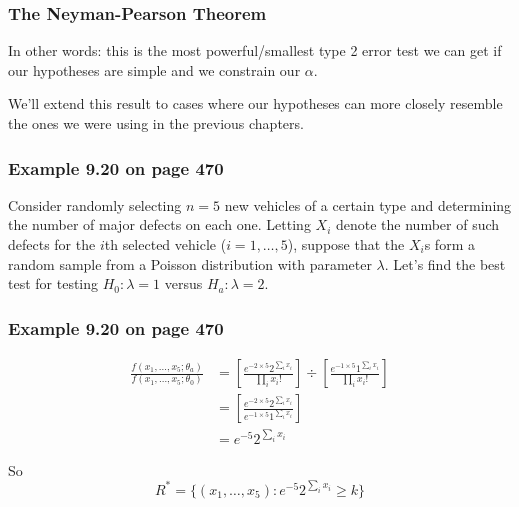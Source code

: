 \documentclass{beamer}
\begin{document}
\begin{frame}
\frametitle{The Neyman-Pearson Theorem}

In other words: this is the most powerful/smallest type 2 error test we can get if our hypotheses are simple and we constrain our $\alpha$.
\newline

We'll extend this result to cases where our hypotheses can more closely resemble the ones we were using in the previous chapters.

\end{frame}


\begin{frame}
\frametitle{Example 9.20 on page 470}

Consider randomly selecting $n=5$ new vehicles of a certain type and determining the number of major defects on each one. Letting $X_i$ denote the number of such defects for the $i$th selected vehicle ($i=1, \ldots, 5$), suppose that the $X_i$s form a random sample from a Poisson distribution with parameter $\lambda$. Let's find the best test for testing $H_0: \lambda = 1$ versus $H_a: \lambda = 2$. 

\end{frame}


\begin{frame}
\frametitle{Example 9.20 on page 470}

\begin{align*}
\frac{f(x_1, \ldots, x_5 ; \theta_a)}{f(x_1, \ldots, x_5 ; \theta_0)}  &= \left[\frac{e^{-2 \times 5}2^{\sum_i x_i} }{\prod_i x_i! }\right] \div \left[\frac{e^{-1 \times 5}1^{\sum_i x_i} }{\prod_i x_i! }\right] \\
&= \left[\frac{e^{-2\times 5}2^{\sum_i x_i} }{e^{-1 \times 5}1^{\sum_i x_i} }\right] \\
&= e^{-5}2^{\sum_i x_i}
\end{align*}

So 
\[
R^* = \{(x_1, \ldots, x_5) : e^{-5}2^{\sum_i x_i} \ge k\}
\]


\end{frame}

\end{document}
